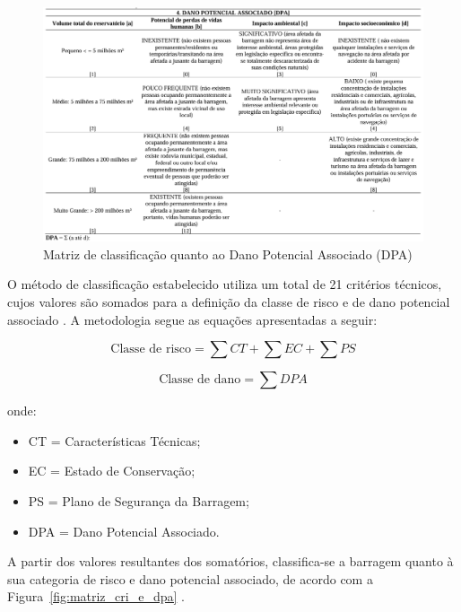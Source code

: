 \begin{figure}[htbp]
    \centering
    \includegraphics[width=\textwidth]{figures/image25_dano_potencial.png}
    \caption{Matriz de classificação quanto ao Dano Potencial Associado (DPA)}
    \label{fig:dano_potencial}
\end{figure}

O método de classificação estabelecido utiliza um total de 21 critérios técnicos, cujos valores são somados para a definição da classe de risco e de dano potencial associado \cite{cruz2024}. A metodologia segue as equações apresentadas a seguir:

\begin{equation}
\text{Classe de risco} = \sum CT + \sum EC + \sum PS
\label{eq:classe_risco}
\end{equation}

\begin{equation}
\text{Classe de dano} = \sum DPA
\label{eq:classe_dano}
\end{equation}

\noindent onde:
\begin{itemize}
    \item CT = Características Técnicas;
    \item EC = Estado de Conservação;
    \item PS = Plano de Segurança da Barragem;
    \item DPA = Dano Potencial Associado.
\end{itemize}

A partir dos valores resultantes dos somatórios, classifica-se a barragem quanto à sua categoria de risco e dano potencial associado, de acordo com a Figura~\ref{fig:matriz_cri_e_dpa} \cite{moecke2019}.

